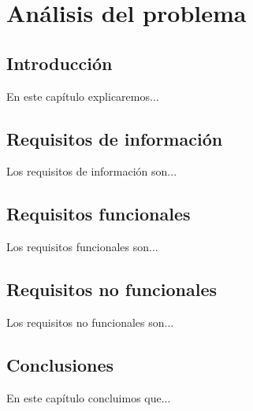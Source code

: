 \chapter{Análisis del problema}\label{cap:analisis}

\section{Introducción}
En este capítulo explicaremos...

\section{Requisitos de información}
Los requisitos de información son...

\section{Requisitos funcionales}
Los requisitos funcionales son...

\section{Requisitos no funcionales}
Los requisitos no funcionales son...

\section{Conclusiones}
En este capítulo concluimos que...